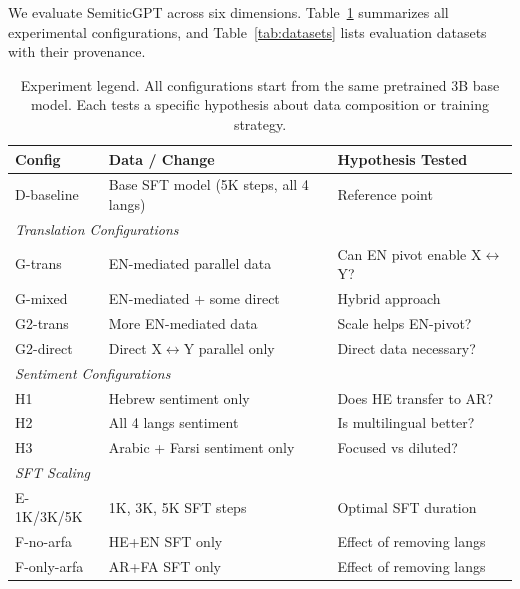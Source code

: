\documentclass[10pt,twocolumn]{article}
\begin{document}
We evaluate SemiticGPT across six dimensions. Table~\ref{tab:experiments} summarizes all experimental configurations, and Table~\ref{tab:datasets} lists evaluation datasets with their provenance.

\begin{table}[H]
\centering\scriptsize
\begin{tabular}{lp{2.0cm}p{2.2cm}}
\toprule
\textbf{Config} & \textbf{Data / Change} & \textbf{Hypothesis Tested} \\
\midrule
D-baseline & Base SFT model (5K steps, all 4 langs) & Reference point \\
\midrule
\multicolumn{3}{l}{\textit{Translation Configurations}} \\
G-trans & EN-mediated parallel data & Can EN pivot enable X$\leftrightarrow$Y? \\
G-mixed & EN-mediated + some direct & Hybrid approach \\
G2-trans & More EN-mediated data & Scale helps EN-pivot? \\
G2-direct & Direct X$\leftrightarrow$Y parallel only & Direct data necessary? \\
\midrule
\multicolumn{3}{l}{\textit{Sentiment Configurations}} \\
H1 & Hebrew sentiment only & Does HE transfer to AR? \\
H2 & All 4 langs sentiment & Is multilingual better? \\
H3 & Arabic + Farsi sentiment only & Focused vs diluted? \\
\midrule
\multicolumn{3}{l}{\textit{SFT Scaling}} \\
E-1K/3K/5K & 1K, 3K, 5K SFT steps & Optimal SFT duration \\
F-no-arfa & HE+EN SFT only & Effect of removing langs \\
F-only-arfa & AR+FA SFT only & Effect of removing langs \\
\bottomrule
\end{tabular}
\caption{Experiment legend. All configurations start from the same pretrained 3B base model. Each tests a specific hypothesis about data composition or training strategy.}
\label{tab:experiments}
\end{table}
\end{document}
